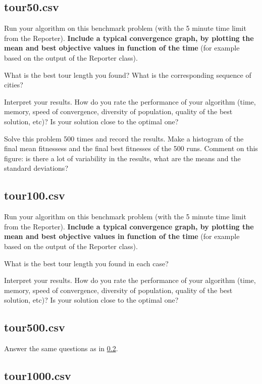 \documentclass[a4paper,10pt]{article}
\newcommand{\ReplaceMe}[1]{{\color{blue}#1}}
\begin{document}
\subsection{tour50.csv}

\ReplaceMe{Run your algorithm on this benchmark problem (with the 5 minute time limit from the Reporter). \textbf{Include a typical convergence graph, by plotting the mean and best objective values in function of the time} (for example based on the output of the Reporter class).

What is the best tour length you found? What is the corresponding sequence of cities? 

Interpret your results. How do you rate the performance of your algorithm (time, memory, speed of convergence, diversity of population, quality of the best solution, etc)? Is your solution close to the optimal one?

Solve this problem 500 times and record the results. Make a histogram of the final mean fitnessess and the final best fitnesses of the 500 runs. Comment on this figure: is there a lot of variability in the results, what are the means and the standard deviations?}

\subsection{tour100.csv}\label{sec_shorttour}

\ReplaceMe{Run your algorithm on this benchmark problem (with the 5 minute time limit from the Reporter). \textbf{Include a typical convergence graph, by plotting the mean and best objective values in function of the time} (for example based on the output of the Reporter class).

What is the best tour length you found in each case? 

Interpret your results. How do you rate the performance of your algorithm (time, memory, speed of convergence, diversity of population, quality of the best solution, etc)? Is your solution close to the optimal one?}

\subsection{tour500.csv}

\ReplaceMe{Answer the same questions as in \cref{sec_shorttour}.}

\subsection{tour1000.csv}
\end{document}
